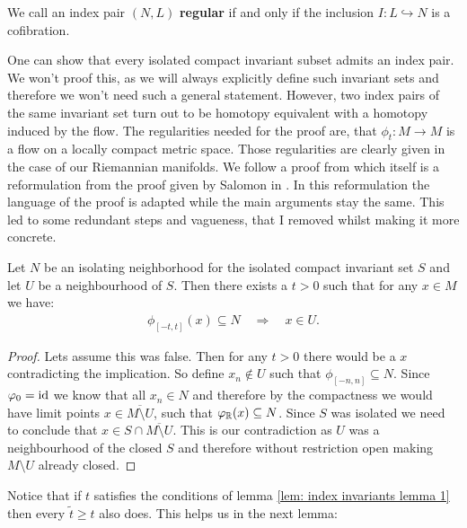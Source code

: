 \begin{definition}
We call an index pair $(N,L)$ \textbf{regular} if and only if the inclusion $I: L \hookrightarrow N$ is a cofibration.
\end{definition}
\begin{remark}
One can show that every isolated compact invariant subset admits an index pair. We won't proof this, as we will always explicitly define such invariant sets and therefore we won't need such a general statement. However, two index pairs of the same invariant set turn out to be homotopy equivalent with a homotopy induced by the flow. The regularities needed for the proof are, that $\phi_t:M\to M$ is a flow on a locally compact metric space. Those regularities are clearly given in the case of our Riemannian manifolds. We follow a proof from \cite{LecturesonMorseHomology} which itself is a reformulation from the proof given by Salomon in \cite{SalomonConleyIndex}. In this reformulation the language of the proof is adapted while the main arguments stay the same. This led to some redundant steps and vagueness, that I removed whilst making it more concrete.
\end{remark}
\begin{lemma}\label{lem: index invariants lemma 1}
Let $N$ be an isolating neighborhood for the isolated compact invariant set $S$ and let $U$ be a neighbourhood of $S$. Then there exists a $t>0$ such that for any $x \in M$ we have:
\begin{align*}
\phi_{[-t,t]}(x)\subseteq N  \quad \Rightarrow \quad x\in U.
\end{align*} 
\end{lemma}
\begin{proof}
Lets assume this was false. Then for any $t>0$ there would be a $x$ contradicting the implication. So define $x_n \notin U$ such that $\phi_{[-n,n]}\subseteq N$. Since $\varphi_0=\text{id}$ we know that all $x_n\in N$ and therefore by the compactness we would have limit points $x\in \overline{M\setminus U}$, such that $\varphi_{\mathbb{R}}(x)\subseteq N$. Since $S$ was isolated we need to conclude that $x\in S \cap \overline{M\setminus U}$. This is our contradiction as $U$ was a neighbourhood of the closed $S$ and therefore without restriction open making $M\setminus U$ already closed.
\end{proof}
\begin{remark}
Notice that if $t$ satisfies the conditions of lemma \ref{lem: index invariants lemma 1} then every $\tilde{t}\geq t$ also does. This helps us in the next lemma:
\end{remark}


